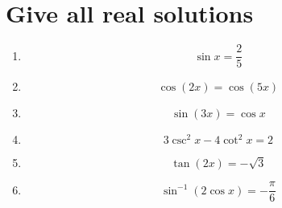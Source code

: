 \documentclass[12pt]{article}
\begin{document}
\section*{Give all real solutions}
\begin{enumerate}[leftmargin=*,itemsep=1.35em,resume]
  \item
  \[
    \sin x=\frac25
  \]

  \item
  \[
    \cos(2x)=\cos(5x)
  \]

  \item
  \[
    \sin(3x)=\cos x
  \]

  \item
  \[
    3\csc^2x-4\cot^2x=2
  \]

  \item
  \[
    \tan(2x)=-\sqrt3
  \]

  \item
  \[
    \sin^{-1}(2\cos x)=-\frac{\pi}{6}
  \]
\end{enumerate}
\end{document}
